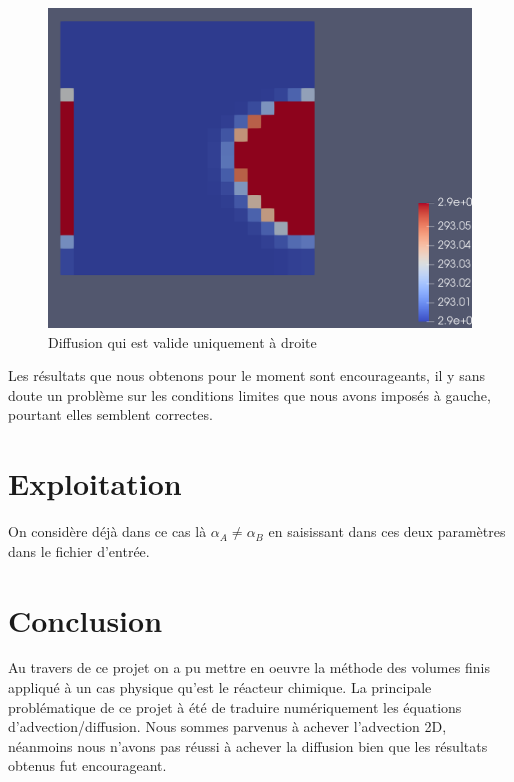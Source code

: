 \documentclass[a4paper,oneside]{article}
\makeatletter
\def\bigcenter{\trivlist \bigcentering\item\relax}
\def\bigcentering{\let\\\@centercr\rightskip\@bigflushglue%
\leftskip\@bigflushglue
\parindent\z@\parfillskip\z@skip}
\makeatother
\begin{document}
\begin{figure}[h!]
\bigcenter
\includegraphics[scale=0.4]{Diffusion/Diffusion.png}
\caption{Diffusion qui est valide uniquement à droite}
\end{figure}


Les résultats que nous obtenons pour le moment sont encourageants, il y  sans doute un problème sur les conditions limites que nous avons imposés à gauche, pourtant elles semblent correctes.

\section{Exploitation}

On considère déjà dans ce cas là $\alpha_A \neq \alpha_B$ en saisissant dans ces deux paramètres dans le fichier d'entrée.

\section{Conclusion}

Au travers de ce projet on a pu mettre en oeuvre la méthode des volumes finis appliqué à un cas physique qu'est le réacteur chimique.
La principale problématique de ce projet à été de traduire numériquement les équations d'advection/diffusion.
Nous sommes parvenus à achever l'advection 2D, néanmoins nous n'avons pas réussi à achever la diffusion bien que les résultats obtenus fut encourageant.
\end{document}
